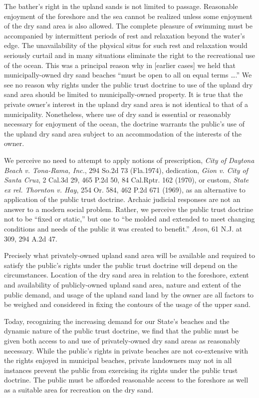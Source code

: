 The bather's right in the upland sands is not limited to passage. Reasonable
enjoyment of the foreshore and the sea cannot be realized unless some enjoyment
of the dry sand area is also allowed. The complete pleasure of swimming must be
accompanied by intermittent periods of rest and relaxation beyond the water's
edge. The unavailability of the physical situs for such rest and relaxation
would seriously curtail and in many situations eliminate the right to the
recreational use of the ocean. This was a principal reason why in [earlier
cases] we held that municipally-owned dry sand beaches ``must be open to all on
equal terms \ldots.'' We see no reason why rights under the public trust
doctrine to use of the upland dry sand area should be limited to
municipally-owned property. It is true that the private owner's interest in the
upland dry sand area is not identical to that of a municipality. Nonetheless,
where use of dry sand is essential or reasonably necessary for enjoyment of the
ocean, the doctrine warrants the public's use of the upland dry sand area
subject to an accommodation of the interests of the owner.

We perceive no need to attempt to apply notions of prescription, \textit{City of
Daytona Beach v. Tona-Rama, Inc.},  294 So.2d 73 (Fla.1974),
dedication, \textit{Gion v. City of Santa Cruz},  2 Cal.3d 29, 465
P.2d 50, 84 Cal.Rptr. 162 (1970), or custom, \textit{State ex
rel. Thornton v. Hay},  254 Or. 584, 462 P.2d 671 (1969), as
an alternative to application of the public trust doctrine. Archaic judicial
responses are not an answer to a modern social problem. Rather, we perceive the
public trust doctrine not to be ``fixed or static,'' but one to ``be molded and
extended to meet changing conditions and needs of the public it was created to
benefit.'' \textit{Avon},  61 N.J. at 309, 294 A.2d 47.

Precisely what privately-owned upland sand area will be available and required
to satisfy the public's rights under the public trust doctrine will depend on
the circumstances. Location of the dry sand area in relation to the foreshore,
extent and availability of publicly-owned upland sand area, nature and extent of
the public demand, and usage of the upland sand land by the owner are all
factors to be weighed and considered in fixing the contours of the usage of the
upper sand.

Today, recognizing the increasing demand for our State's beaches and the dynamic
nature of the public trust doctrine, we find that the public must be given both
access to and use of privately-owned dry sand areas as reasonably necessary.
While the public's rights in private beaches are not co-extensive with the
rights enjoyed in municipal beaches, private landowners may not in all instances
prevent the public from exercising its rights under the public trust doctrine.
The public must be afforded reasonable access to the foreshore as well as a
suitable area for recreation on the dry sand.

